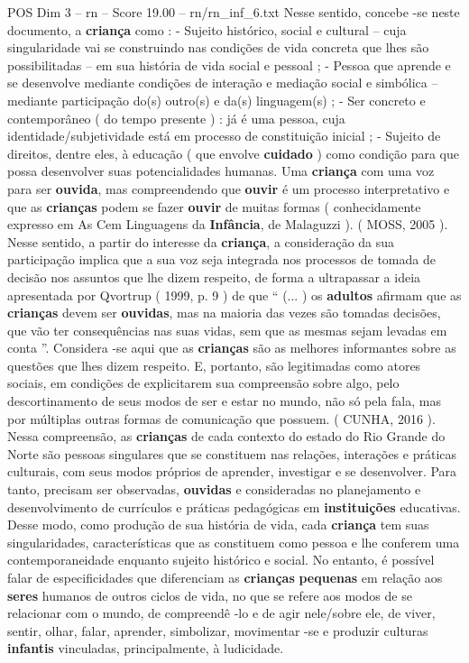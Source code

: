 \begin{textsample}{POS Dim 3 – rn – Score 19.00 – rn/rn\_inf\_6.txt}
Nesse sentido, concebe -se neste documento, a \textbf{criança} como : - Sujeito histórico, social e cultural – cuja singularidade vai se construindo nas condições de vida concreta que lhes são possibilitadas – em sua história de vida social e pessoal ; - Pessoa que aprende e se desenvolve mediante condições de interação e mediação social e simbólica – mediante participação do(s) outro(s) e da(s) linguagem(s) ; - Ser concreto e contemporâneo ( do tempo presente ) : já é uma pessoa, cuja identidade/subjetividade está em processo de constituição inicial ; - Sujeito de direitos, dentre eles, à educação ( que envolve \textbf{cuidado} ) como condição para que possa desenvolver suas potencialidades humanas.
Uma \textbf{criança} com uma voz para ser \textbf{ouvida}, mas compreendendo que \textbf{ouvir} é um processo interpretativo e que as \textbf{crianças} podem se fazer \textbf{ouvir} de muitas formas ( conhecidamente expresso em As Cem Linguagens da \textbf{Infância}, de Malaguzzi ). ( MOSS, 2005 ).
Nesse sentido, a partir do interesse da \textbf{criança}, a consideração da sua participação implica que a sua voz seja integrada nos processos de tomada de decisão nos assuntos que lhe dizem respeito, de forma a ultrapassar a ideia apresentada por Qvortrup ( 1999, p. 9 ) de que “ (... ) os \textbf{adultos} afirmam que as \textbf{crianças} devem ser \textbf{ouvidas}, mas na maioria das vezes são tomadas decisões, que vão ter consequências nas suas vidas, sem que as mesmas sejam levadas em conta ”.
Considera -se aqui que as \textbf{crianças} são as melhores informantes sobre as questões que lhes dizem respeito.
E, portanto, são legitimadas como atores sociais, em condições de explicitarem sua compreensão sobre algo, pelo descortinamento de seus modos de ser e estar no mundo, não só pela fala, mas por múltiplas outras formas de comunicação que possuem. ( CUNHA, 2016 ).
Nessa compreensão, as \textbf{crianças} de cada contexto do estado do Rio Grande do Norte são pessoas singulares que se constituem nas relações, interações e práticas culturais, com seus modos próprios de aprender, investigar e se desenvolver.
Para tanto, precisam ser observadas, \textbf{ouvidas} e consideradas no planejamento e desenvolvimento de currículos e práticas pedagógicas em \textbf{instituições} educativas.
Desse modo, como produção de sua história de vida, cada \textbf{criança} tem suas singularidades, características que as constituem como pessoa e lhe conferem uma contemporaneidade enquanto sujeito histórico e social.
No entanto, é possível falar de especificidades que diferenciam as \textbf{crianças} \textbf{pequenas} em relação aos \textbf{seres} humanos de outros ciclos de vida, no que se refere aos modos de se relacionar com o mundo, de compreendê -lo e de agir nele/sobre ele, de viver, sentir, olhar, falar, aprender, simbolizar, movimentar -se e produzir culturas \textbf{infantis} vinculadas, principalmente, à ludicidade.

\end{textsample}
